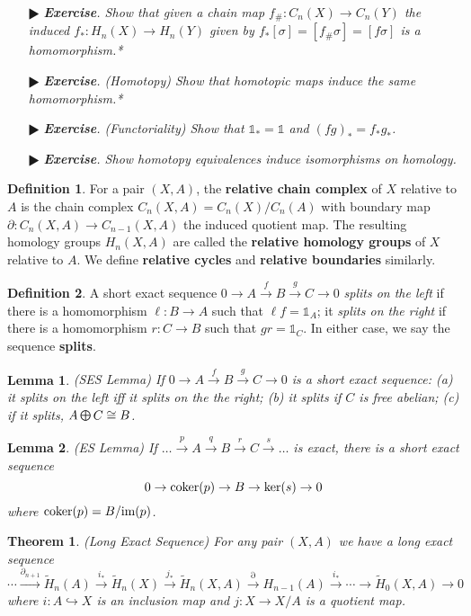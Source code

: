 \documentclass[11pt]{amsart}
\newtheorem*{theorem*}{Theorem}
\newtheorem*{lemma*}{Lemma}
\theoremstyle{definition}
\newtheorem*{definition*}{Definition}
\renewcommand\tilde{\widetilde}
\renewcommand\:{\colon}
\newcommand{\1}{\mathds{1}}
\newcommand{\coker}{\textnormal{coker}}
\newcommand{\im}{\textnormal{im}}
\DeclareMathOperator*{\moplus}{\text{\raisebox{0.25ex}{\scalebox{0.8}{$\bigoplus$}}}}
\newcommand{\exc}[1]{\vspace{-2.5pt}\begin{itemize}[leftmargin=15pt]\item[$\RHD$] \textit{\textbf{Exercise}. #1}\end{itemize}}
\begin{document}
\exc{Show that given a chain map $f_\#\: C_n(X) \to C_n(Y)$ the induced $f_*\: H_n(X) \to H_n(Y)$ given by $f_*[\sigma] = [f_\# \sigma] = [f\sigma]$ is a homomorphism.*}
\exc{\textnormal{(Homotopy)} Show that homotopic maps induce the same homomorphism.*}
\exc{\textnormal{(Functoriality)} Show that $\1_* = \1$ and $(fg)_* = f_*g_*$.} 
\exc{Show homotopy equivalences induce isomorphisms on homology.}

\begin{definition*}
	For a pair $(X, A)$, the \textbf{relative chain complex} of $X$ relative to $A$ is the chain complex $C_n(X, A) = C_n(X)/C_n(A)$ with boundary map $\partial\: C_n(X, A) \to C_{n-1}(X, A)$ the induced quotient map. The resulting homology groups $H_n(X, A)$ are called the \textbf{relative homology groups} of $X$ relative to $A$. We define \textbf{relative cycles} and \textbf{relative boundaries} similarly.
\end{definition*}

\begin{definition*}
	A short exact sequence $0 \to A \xrightarrow{f} B \xrightarrow{g} C \to 0$ \textit{splits on the left} if there is a homomorphism $\ell\: B \to A$ such that $\ell f = \1_A$; it \textit{splits on the right} if there is a homomorphism $r\: C \to B$ such that $gr = \1_C$. In either case, we say the sequence \textbf{splits}.
\end{definition*}

\begin{lemma*}
	\textnormal{(SES Lemma)} If $0 \to A \xrightarrow{f} B \xrightarrow{g} C \to 0$ is a short exact sequence: \textnormal{(a)} it splits on the left iff it splits on the the right; \textnormal{(b)} it splits if $C$ is free abelian; \textnormal{(c)} if it splits, $A \moplus C \cong B$.
\end{lemma*}
\begin{lemma*}
	\textnormal{(ES Lemma)} If $\dots \xrightarrow{p} A \xrightarrow{q} B \xrightarrow{r} C \xrightarrow{s} \dots$ is exact, there is a short exact sequence
		\[ 0 \to \coker(p) \to B \to \ker(s) \to 0 \]
	where $\coker(p) = B/\im(p)$.
\end{lemma*}

\begin{theorem*}
	\textnormal{(Long Exact Sequence)} For any pair $(X, A)$ we have a long exact sequence
		\begin{equation}\label{LES} \cdots \xrightarrow{\partial_{n+1}} \tilde H_n(A) \xrightarrow{i_*} \tilde H_n(X) \xrightarrow{j_*}\tilde H_n(X, A) \xrightarrow{\partial} H_{n-1}(A) \xrightarrow{i_*} \cdots \to \tilde H_0(X, A) \to 0 \end{equation}
	where $i\: A \hookrightarrow X$ is an inclusion map and $j\: X \to X/A$ is a quotient map.
\end{theorem*}
\end{document}
